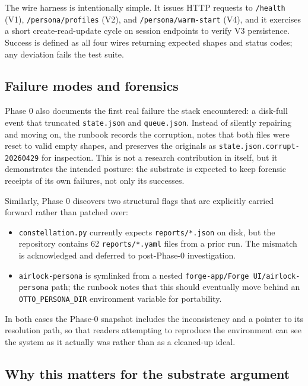 The wire harness is intentionally simple. It issues HTTP requests to
\texttt{/health} (V1), \texttt{/persona/profiles} (V2), and
\texttt{/persona/warm-start} (V4), and it exercises a short
create-read-update cycle on session endpoints to verify V3 persistence.
Success is defined as all four wires returning expected shapes and
status codes; any deviation fails the test suite.

\subsection{Failure modes and
forensics}\label{failure-modes-and-forensics}

Phase 0 also documents the first real failure the stack encountered: a
disk-full event that truncated \texttt{state.json} and
\texttt{queue.json}. Instead of silently repairing and moving on, the
runbook records the corruption, notes that both files were reset to
valid empty shapes, and preserves the originals as
\texttt{state.json.corrupt-20260429} for inspection. This is not a
research contribution in itself, but it demonstrates the intended
posture: the substrate is expected to keep forensic receipts of its own
failures, not only its successes.

Similarly, Phase 0 discovers two structural flags that are explicitly
carried forward rather than patched over:

\begin{itemize}
\tightlist
\item
  \texttt{constellation.py} currently expects \texttt{reports/*.json} on
  disk, but the repository contains 62 \texttt{reports/*.yaml} files
  from a prior run. The mismatch is acknowledged and deferred to
  post-Phase-0 investigation.
\item
  \texttt{airlock-persona} is symlinked from a nested
  \texttt{forge-app/Forge\ UI/airlock-persona} path; the runbook notes
  that this should eventually move behind an \texttt{OTTO\_PERSONA\_DIR}
  environment variable for portability.
\end{itemize}

In both cases the Phase-0 snapshot includes the inconsistency and a
pointer to its resolution path, so that readers attempting to reproduce
the environment can see the system as it actually was rather than as a
cleaned-up ideal.

\subsection{Why this matters for the substrate
argument}\label{why-this-matters-for-the-substrate-argument}

